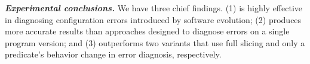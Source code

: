 \vspace{1mm}

\noindent \textbf{\textit{Experimental conclusions.}}
We have three chief findings. (1) \ourtool is highly effective
in diagnosing configuration errors introduced by software 
evolution; (2) \ourtool produces more accurate results than
approaches designed to diagnose errors on a single program version;
and (3) \ourtool outperforms two variants
that use full slicing and only  a predicate's
behavior change in error diagnosis, respectively.

